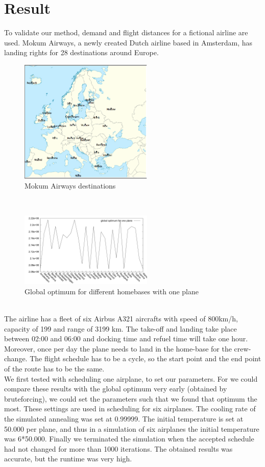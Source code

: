 \documentclass[journal]{IEEEtran}
\begin{document}
\section{Result}
To validate our method, demand and flight distances for a fictional airline are used. Mokum Airways, a newly created Dutch airline based in Amsterdam, has landing rights for 28 destinations around Europe.\\
\begin{figure}[!h]
\centering
\includegraphics[width=2.5in]{europe}
\caption{Mokum Airways destinations}
\label{fig:europe}
\end{figure}
\\
\begin{figure}[!h]
\centering
\includegraphics[width=2.5in]{different_homebases_one_plane}
\caption{Global optimum for different homebases with one plane}
\label{fig:different_homebase_one_plane}
\end{figure}
\\
The airline has a fleet of six Airbus A321 aircrafts with speed of 800km/h, capacity of 199 and range of 3199 km. The take-off and landing take place between 02:00 and 06:00 and docking time and refuel time will take one hour. Moreover, once per day the plane needs to land in the home-base for the crew-change. The flight schedule has to be a cycle, so the start point and the end point of the route has to be the same.\\
We first tested with scheduling one airplane, to set our parameters. For we could compare these results with the global optimum very early (obtained by bruteforcing), we could set the parameters such that we found that optimum the most. These settings are used in scheduling for six airplanes. The cooling rate of the simulated annealing was set at 0.99999. The initial temperature is set at 50.000 per plane, and thus in a simulation of six airplanes the initial temperature was 6*50.000. Finally we terminated the simulation when the accepted schedule had not changed for more than 1000 iterations. The obtained results was accurate, but the runtime was very high. \\
\end{document}

